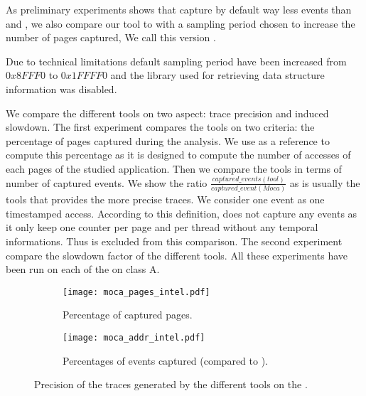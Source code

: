 As preliminary experiments shows that \Mitos capture by
default way less events than \TABARNAC and \Moca, we also compare our tool to
\Mitos with a sampling period chosen to increase the number of pages
captured, We call this version \MitosTun.

Due to technical limitations \MemProf default sampling period have been
increased from  $0x8FFF0$ to $0x1FFFF0$ and the library used for retrieving
data structure information was disabled.


We compare the different tools on two aspect: trace
precision and induced slowdown. The first experiment compares the tools on two
criteria:  the percentage of pages captured during the analysis. We use
\TABARNAC as a reference to compute this percentage as it is designed to
compute the number of accesses of each pages of the studied application. Then we
compare the tools in terms of number of captured events. We show the ratio
$\frac{captured\_events(tool)}{captured\_event(Moca)}$ as \Moca is usually the
tools that provides the more precise traces. We consider one event as one
timestamped access. According to this definition, \TABARNAC does not capture
any events as it only keep one counter per page and per thread without any
temporal informations. Thus \TABARNAC is excluded from this comparison.
The second experiment compare the
slowdown factor of the different tools.
All these experiments have been run on each of the \NPB on class A.

\begin{figure}[htb]
    \centering
    \begin{subfigure}{\linewidth}
        \texttt{[image: moca\_pages\_intel.pdf]}
        \caption{Percentage of captured pages.}
        \label{fig:pages}
    \end{subfigure}
    \begin{subfigure}{\linewidth}
        \texttt{[image: moca\_addr\_intel.pdf]}
        \caption{Percentages of events captured (compared to \Moca).}
        \label{fig:addr}
    \end{subfigure}
    \caption{Precision of the traces generated by the different tools on the \NPB.}
    \label{fig:pages-addr}
\end{figure}

